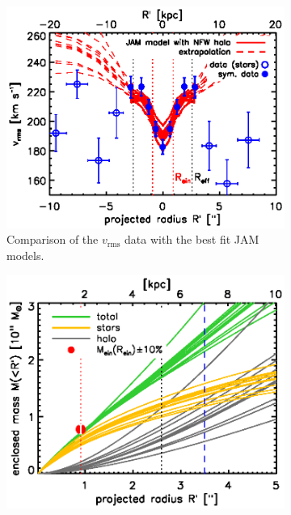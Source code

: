 \documentclass[useAMS,usenatbib]{mnras}
\begin{document}
\begin{figure}
\label{fig:modelB4_triangle}
\end{figure}

\begin{figure}
\centering
\begin{subfigure}{.48\textwidth}
  \centering
  \includegraphics[width=0.9\linewidth]{fig/B4_rms_error_curves.ps}
  \caption{Comparison of the $v_\text{rms}$ data with the best fit JAM models.}
  \label{fig:modelB4_vrms}
\end{subfigure}%
\hspace{.02\textwidth}
\begin{subfigure}{.48\textwidth}
  \centering
  \includegraphics[width=0.9\linewidth]{fig/B4_jam_profiles_errors_short_projmass.ps}

\end{subfigure}
\end{figure}
\end{document}
